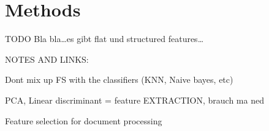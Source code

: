 \section{Methods}
\label{sec:methods}


TODO
Bla bla\ldots es gibt flat und structured features\ldots





	
NOTES AND LINKS:


Dont mix up FS with the classifiers (KNN, Naive bayes, etc)

PCA, Linear discriminant = feature EXTRACTION, brauch ma ned


Feature selection for document processing 
